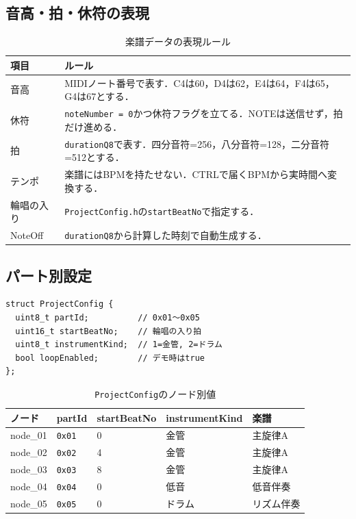 \documentclass[uplatex,dvipdfmx]{jlreq}
\newcommand{\code}[1]{\texttt{#1}}
\begin{document}
\subsection{音高・拍・休符の表現}

\begin{table}[H]
\centering
\caption{楽譜データの表現ルール}
\label{tab:notation-rule}
\begin{tabular}{p{}p{}}
\toprule
\textbf{項目} & \textbf{ルール} \\
\midrule
音高 & MIDIノート番号で表す．C4は60，D4は62，E4は64，F4は65，G4は67とする．\\
休符 & \code{noteNumber = 0}かつ休符フラグを立てる．NOTEは送信せず，拍だけ進める．\\
拍 & \code{durationQ8}で表す．四分音符=256，八分音符=128，二分音符=512とする．\\
テンポ & 楽譜にはBPMを持たせない．CTRLで届くBPMから実時間へ変換する．\\
輪唱の入り & \code{ProjectConfig.h}の\code{startBeatNo}で指定する．\\
NoteOff & \code{durationQ8}から計算した時刻で自動生成する．\\
\bottomrule
\end{tabular}
\end{table}

\subsection{パート別設定}

\begin{verbatim}
struct ProjectConfig {
  uint8_t partId;          // 0x01〜0x05
  uint16_t startBeatNo;    // 輪唱の入り拍
  uint8_t instrumentKind;  // 1=金管, 2=ドラム
  bool loopEnabled;        // デモ時はtrue
};
\end{verbatim}

\begin{table}[H]
\centering
\caption{\code{ProjectConfig}のノード別値}
\label{tab:config-values}
\begin{tabular}{p{}p{}p{}p{}p{}}
\toprule
\textbf{ノード} & \textbf{partId} & \textbf{startBeatNo} & \textbf{instrumentKind} & \textbf{楽譜} \\
\midrule
node\_01 & \code{0x01} & 0 & 金管 & 主旋律A \\
node\_02 & \code{0x02} & 4 & 金管 & 主旋律A \\
node\_03 & \code{0x03} & 8 & 金管 & 主旋律A \\
node\_04 & \code{0x04} & 0 & 低音 & 低音伴奏 \\
node\_05 & \code{0x05} & 0 & ドラム & リズム伴奏 \\
\bottomrule
\end{tabular}
\end{table}
\end{document}
